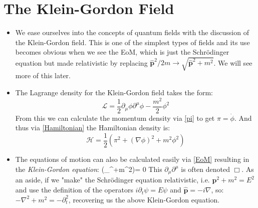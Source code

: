 \documentclass[11pt]{article}
\renewenvironment{flalign}{\vspace{-3mm}\empheq[box=\tcbhighmath]{align}}{\endempheq}
\numberwithin{equation}{section}
\begin{document}
\section{The Klein-Gordon Field}
\begin{itemize}
  \item We ease ourselves into the concepts of quantum fields with the discussion of the Klein-Gordon field. This is one of the simplest types of fields and its use becomes obvious when we see the EoM, which is just the Schr\"odinger equation but made relativistic by replacing $\hat{\textbf{p}}^2/2m \rightarrow \sqrt{\hat{\textbf{p}}^2 + m^2}$. We will see more of this later.

     \item The Lagrange density for the Klein-Gordon field takes the form:
     \begin{equation}
       \label{KG field}
       \mathcal{L} = \frac{1}{2}\partial_{\mu} \phi \partial^{\mu}\phi -\frac{m^2}{2}\phi^2
     \end{equation}   
From this we can calculate the momentum density via \ref{pi} to get $\pi = \dot{\phi}$. And thus via \ref{Hamiltonian} the Hamiltonian density is:
\begin{equation}
\label{KG_Ham}
  \mathcal{H} = \frac{1}{2}\left(\pi^2 +(\nabla\phi)^2+m^2\phi^2\right) 
\end{equation}
\item The equations of motion can also be calculated easily via \ref{EoM} resulting in the \emph{Klein-Gordon equation}:
\begin{flalign}
\label{KG eq}
  (\partial_{\mu}\partial^{\mu}+m^2)\phi  = 0
\end{flalign} 
This $\partial_{\mu}\partial^{\mu}$ is often denoted $\Box$. As an aside, if we "make" the Schr\"odinger equation relativistic, i.e. $\textbf{p}^2 + m^2 = E^2$ and use the definition of the operators $ i\partial_t\psi= E\psi $ and $\hat{\textbf{p}} = -i\nabla$, so:  $-\nabla^2 + m^2 = -\partial^2_t$, recovering us the above Klein-Gordon equation.  
\end{itemize}
\end{document}
